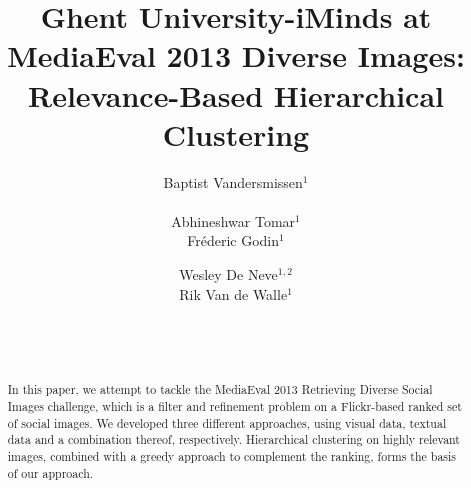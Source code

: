 \documentclass{acm_proc_article-me11_tweaked}
\begin{document}

\title{Ghent University-iMinds at MediaEval 2013 Diverse Images: Relevance-Based Hierarchical Clustering}

\author{
Baptist Vandersmissen$^1$\\
\\    
\alignauthor
Abhineshwar Tomar$^1$ \\
\alignauthor
Fr\'ederic Godin$^1$\\
\and  %
\alignauthor
Wesley De Neve$^{1,2}$\\
\alignauthor
Rik Van de Walle$^1$\\
\and
\\
\\ 
}
\maketitle
\begin{abstract}
In this paper, we attempt to tackle the MediaEval 2013 Retrieving Diverse Social Images challenge, which is a filter and refinement problem on a Flickr-based ranked set of social images.
We developed three different approaches, using visual data, textual data and a combination thereof, respectively.
Hierarchical clustering on highly relevant images, combined with a greedy approach to complement the ranking, forms the basis of our approach.
\end{abstract}
% 
% 
\end{document}
